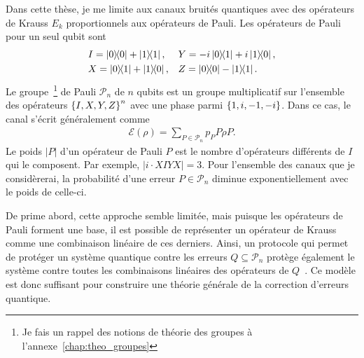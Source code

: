 Dans cette thèse,
je me limite aux canaux bruités quantiques avec des opérateurs 
de Krauss $E_k$ proportionnels aux opérateurs de Pauli.
Les opérateurs de Pauli pour un seul qubit sont 
\begin{align}
  &I = \op{0}{0} + \op{1}{1}, 
  &&Y = -i\op{0}{1} + i\op{1}{0}, \notag \\
  &X = \op{0}{1} + \op{1}{0}, 
  &&Z = \op{0}{0} - \op{1}{1}.
\end{align}
Le groupe~\footnote{Je fais un rappel des notions de théorie des groupes à l'annexe~\ref{chap:theo_groupes}}
de Pauli $\mathcal P_n$ de $n$ qubits est un groupe multiplicatif sur 
l'ensemble des opérateurs $\qty{I, X, Y, Z}^n$ avec une phase parmi $\qty{1, i, -1, -i}$.
Dans ce cas,
le canal s'écrit généralement comme
\begin{align}
  \mathcal E(\rho) = \sum_{P \in \mathcal P_n} p_P P\rho P.
\end{align}
Le poids $|P|$ d'un opérateur de Pauli $P$ est le nombre d'opérateurs différents de $I$ qui le composent.
Par exemple, $|i\cdot XIYX| = 3$.
Pour l'ensemble des canaux que je considèrerai,
la probabilité d'une erreur $P \in \mathcal P_n$ diminue exponentiellement avec le poids 
de celle-ci.

De prime abord,
cette approche semble limitée,
mais puisque les opérateurs de Pauli forment une base,
il est possible de représenter un opérateur de Krauss
comme une combinaison linéaire de ces derniers.
Ainsi,
un protocole qui permet de protéger un système quantique contre les erreurs 
$Q \subseteq \mathcal P_n$ protège également le système contre toutes les 
combinaisons linéaires des opérateurs de $Q$~\cite{knill_theory_1997}.
Ce modèle est donc suffisant pour construire une théorie générale de la correction d'erreurs quantique.


